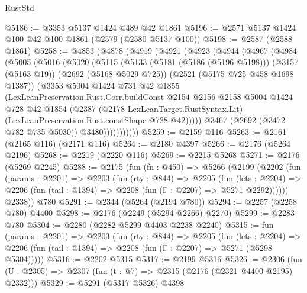 \begin{lexlean}{RustStd}
\begin{coremodule}
{\begin{coremodule}
{{{{{{{{{{@5186 := @3353 @5137 @1424 @489 @42 @1861
@5196 := @2571 @5137 @1424 @100 @42 @100 @1861 (@2579 (@2580 @5137 @100))
@5198 := @2587 (@2588 @1861)
@5258 := @4853
    (@4878
      (@4919
        (@4921
          (@4923
            (@4944
              (@4967
                (@4984
                  (@5005
                    (@5016
                      (@5020
                        (@5115
                          (@5133
                            (@5181 (@5186 (@5196 @5198)))
                            (@3157 (@5163 @19))
                            (@2692 (@5168 @5029 @725))
                            (@2521 (@5175 @725 @458 @1698 @1387))
                            (@3353
                              @5004
                              @1424
                              @731
                              @42
                              @1855
                              (LexLeanPreservation.Rust.Corr.buildConst
                                @2154
                                @2156
                                @2158
                                @5004
                                @1424
                                @728
                                @42
                                @1854
                                (@2387
                                  (@2178 LexLeanTarget.RustSyntax.Lit)
                                  (LexLeanPreservation.Rust.constShape @728 @42)))))
                          @3467
                          (@2692 (@3472 @782 @735 @5030))
                          @3480)))))))))))
@5259 := @2159 @116
@5263 := @2161 (@2165 @116) (@2171 @116)
@5264 := @2180 @4397
@5266 := @2176 (@5264 @2196)
@5268 := @2219 (@2220 @116)
@5269 := @2215 @5268
@5271 := @2176 (@5269 @2245)
@5288 := @2175
    (fun (fn : @450) =>
    @5266
      (@2199
        (@2202
          (fun (params : @2201) =>
          @2203
            (fun (rty : @844) =>
            @2205
              (fun (lets : @2204) =>
              @2206 (fun (tail : @1394) => @2208 (fun (Γ : @2207) => @5271 @2292))))))
        @2338))
    @780
@5291 := @2344 (@5264 (@2194 @780))
@5294 := @2257 (@2258 @780) @4400
@5298 := @2176 (@2249 (@5294 @2266) @2270)
@5299 := @2283 @780
@5304 := @2280 (@2282 @5299 @4403 @2238 @2240)
@5315 := fun (params : @2201) =>
  @2203
    (fun (rty : @844) =>
    @2205
      (fun (lets : @2204) =>
      @2206 (fun (tail : @1394) => @2208 (fun (Γ : @2207) => @5271 (@5298 @5304)))))
@5316 := @2202 @5315
@5317 := @2199 @5316
@5326 := @2306 (fun (U : @2305) => @2307 (fun (t : @7) => @2315 (@2176 (@2321 @4400 @2195) @2332)))
@5329 := @5291 (@5317 @5326) @4398
}}}}}}}}}}
\end{coremodule}}
\end{coremodule}
\end{lexlean}
